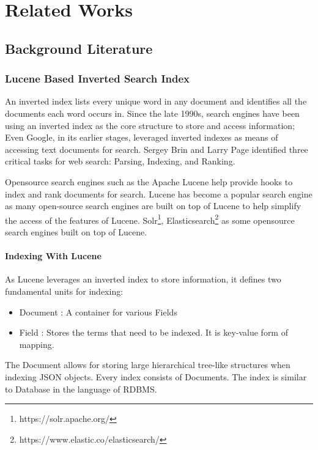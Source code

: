 \chapter{Related Works}
\label{relatedwork}

\section{Background Literature}
\label{relatedwork:background}

\subsection{Lucene Based Inverted Search Index}
An inverted index lists every unique word in any document and identifies all the documents each word occurs in. Since the late 1990s, search engines have been using an inverted index as the core structure to store and access information; Even Google, in its earlier stages, leveraged inverted indexes as means of accessing text documents for search\parencite{brin1998anatomy}. Sergey Brin and Larry Page identified three critical tasks for web search: Parsing, Indexing, and Ranking.

Opensource search engines such as the Apache Lucene\parencite{lucene2010apache} help provide hooks to index and rank documents for search. Lucene has become a popular search engine as many open-source search engines are built on top of Lucene to help simplify the access of the features of Lucene. Solr\footnote{https://solr.apache.org/}, Elasticsearch\footnote{https://www.elastic.co/elasticsearch/} as some opensource search engines built on top of Lucene. 

\subsubsection{Indexing With Lucene}
As Lucene leverages an inverted index to store information, it defines two fundamental units for indexing:
\begin{itemize}
    \item Document : A container for various Fields
    \item Field : Stores the terms that need to be indexed. It is key-value form of mapping. 
\end{itemize}
The Document allows for storing large hierarchical tree-like structures when indexing JSON objects. Every index consists of Documents. The index is similar to Database in the language of RDBMS. 

